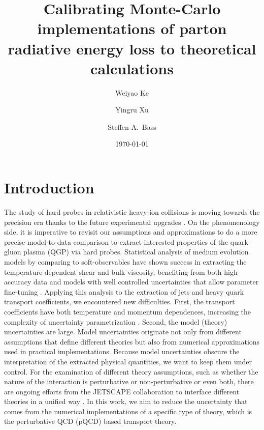 \documentclass[aps, prc, reprint, amsmath, groupedaddress, nofootinbib]{revtex4-1}
\begin{document}
\title{Calibrating Monte-Carlo implementations of parton radiative energy loss to theoretical calculations}
\author{Weiyao Ke}
\author{Yingru Xu}
\author{Steffen A.\ Bass}
\date{\today}
\maketitle 

\section{Introduction}
The study of hard probes in relativistic heavy-ion collisions is moving towards the precision era thanks to the future experimental upgrades \cite{ATLAS-Collaboration:2012iwa,Abelevetal:2014dna,STAR:upgrade-hf,Adare:2015kwa,CMS:2017dec}.
On the phenomenology side, it is imperative to revisit our assumptions and approximations to do a more precise model-to-data comparison to extract interested properties of the quark-gluon plasma (QGP) via hard probes.
Statistical analysis of medium evolution models by comparing to soft-observables have shown success in extracting the temperature dependent shear and bulk viscosity, benefiting from both high accuracy data and models with well controlled uncertainties that allow parameter fine-tuning \cite{Bernhard:2016tnd, Bernhard:2018hnz}.
Applying this analysis to the extraction of jets and heavy quark transport coefficients, we encountered new difficulties. 
First, the transport coefficients have both temperature and momentum dependences, increasing the complexity of uncertainty parametrization \cite{Xu:2017obm}.
Second, the model (theory) uncertainties are large. 
Model uncertainties originate not only from different assumptions that define different theories \cite{CaronHuot:2010bp, Rapp:2018qla} but also from numerical approximations used in practical implementations.
Because model uncertainties obscure the interpretation of the extracted physical quantities, we want to keep them under control.
For the examination of different theory assumptions, such as whether the nature of the interaction is perturbative or non-perturbative or even both, there are ongoing efforts from the JETSCAPE collaboration to interface different theories in a unified way \cite{Cao:2017zih, Kauder:2018cdt}.
In this work, we aim to reduce the uncertainty that comes from the numerical implementations of a specific type of theory, which is the perturbative QCD (pQCD) based transport theory.
\end{document}

